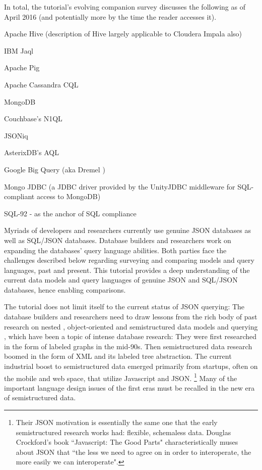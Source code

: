 In total, the tutorial's evolving companion survey 
discusses the following as of April 2016 (and potentially more by the time the reader accesses it).

\begin{compact_enum}
\item Apache Hive \cite{hive-icde-2010} (description of Hive largely applicable to Cloudera Impala \cite{impala} also)
\item IBM Jaql \cite{jaql-pvldb-2011}
\item Apache Pig \cite{pig-sigmod-2008}
\item Apache Cassandra CQL \cite{cassandra-osr-2010}
\item MongoDB \cite{mongodb}
\item Couchbase's N1QL \cite{couchbase,couchbase-sigmod-2016}
\item JSONiq \cite{jsoniq-ieee-ic-2013}
\item AsterixDB's AQL \cite{asterixdb-dpd-2011-all-authors}
\item Google Big Query (aka Dremel \cite{dremel-pvldb-2010})
\item Mongo JDBC \cite{unityjdbc} (a JDBC driver provided by the UnityJDBC middleware for SQL-compliant access to MongoDB)
\item SQL-92 - as the anchor of SQL compliance
\end{compact_enum}

Myriads of developers and researchers currently use genuine JSON databases as well as SQL/JSON databases. Database builders and researchers work on expanding the databases' query language abilities. Both parties face the challenges described below regarding surveying and comparing models and query languages, past and present. This tutorial provides a deep understanding of the current data models and query languages of genuine JSON and SQL/JSON databases, hence enabling comparisons. 

The tutorial does not limit itself to the current status of JSON querying: The database builders and researchers need to draw lessons from the rich body of past research on nested \cite{nest-unnest-pods-1982,nested-relational-vldb-1988,nested-relational-workshop-lncs-1989}, object-oriented \cite{oql-dbpl-1989} and semistructured data models and querying \cite{xml-ql-computer-networks-1999,xml-query-language-survey-sigmod-record-2000,xquery-3.0-w3c-2013}, which have been a topic of intense database research: They were first researched in the form of labeled graphs in the mid-90s. Then semistructured data research boomed in the form of XML and its labeled tree abstraction. The current industrial boost to semistructured data emerged primarily from startups, often on the mobile and web space, that utilize Javascript and JSON.%
\footnote{Their JSON motivation is essentially the same one that the early semistructured research works had: flexible, schemaless data. Douglas Crockford's book ``Javascript: The Good Parts" characteristically muses about JSON that ``the less we need to agree on in order to interoperate, the more easily we can interoperate".
}
Many of the important language design issues of the first eras must be recalled in the new era of semistructured data.

